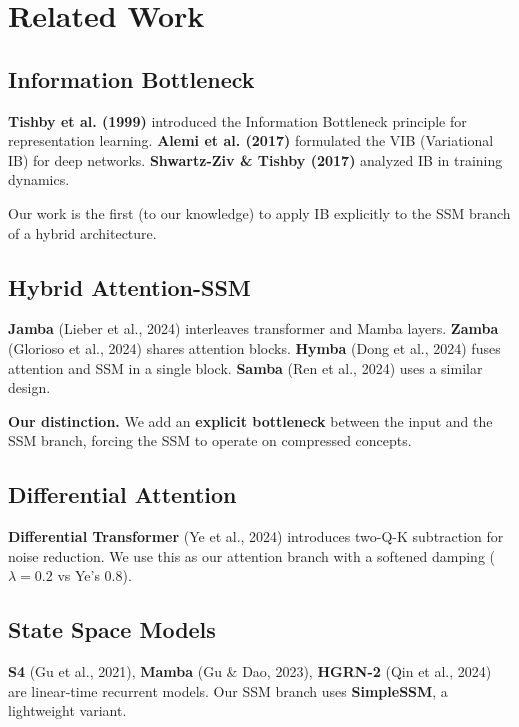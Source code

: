\section{Related Work}

\subsection{Information Bottleneck}

\textbf{Tishby et al. (1999)} introduced the Information Bottleneck principle 
for representation learning. \textbf{Alemi et al. (2017)} formulated the VIB 
(Variational IB) for deep networks. \textbf{Shwartz-Ziv \& Tishby (2017)} 
analyzed IB in training dynamics.

Our work is the first (to our knowledge) to apply IB explicitly to the SSM 
branch of a hybrid architecture.

\subsection{Hybrid Attention-SSM}

\textbf{Jamba} (Lieber et al., 2024) interleaves transformer and Mamba layers. 
\textbf{Zamba} (Glorioso et al., 2024) shares attention blocks. \textbf{Hymba} (Dong 
et al., 2024) fuses attention and SSM in a single block. \textbf{Samba} (Ren et 
al., 2024) uses a similar design.

\textbf{Our distinction.} We add an \textbf{explicit bottleneck} between the input 
and the SSM branch, forcing the SSM to operate on compressed concepts.

\subsection{Differential Attention}

\textbf{Differential Transformer} (Ye et al., 2024) introduces two-Q-K 
subtraction for noise reduction. We use this as our attention branch with 
a softened damping ($\lambda = 0.2$ vs Ye's $0.8$).

\subsection{State Space Models}

\textbf{S4} (Gu et al., 2021), \textbf{Mamba} (Gu \& Dao, 2023), \textbf{HGRN-2} (Qin et 
al., 2024) are linear-time recurrent models. Our SSM branch uses 
\textbf{SimpleSSM}, a lightweight variant.

